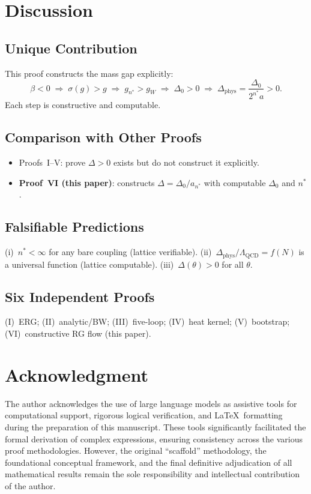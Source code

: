 \documentclass[12pt,a4paper]{article}
\theoremstyle{plain}
\theoremstyle{definition}
\theoremstyle{remark}
\begin{document}
\section{Discussion}\label{sec:discuss}

\subsection{Unique Contribution}

This proof constructs the mass gap explicitly:
\begin{equation}\label{eq:chain6b}
\beta<0 \;\Rightarrow\;
\sigma(g)>g \;\Rightarrow\;
g_{n^*}>g_W \;\Rightarrow\;
\Delta_0>0 \;\Rightarrow\;
\Delta_{\mathrm{phys}}=\frac{\Delta_0}{2^{n^*}a}>0.
\end{equation}
Each step is constructive and computable.

\subsection{Comparison with Other Proofs}

\begin{itemize}[nosep]
\item Proofs~I--V: prove $\Delta>0$ exists but do not construct it explicitly.
\item \textbf{Proof~VI (this paper)}: constructs $\Delta=\Delta_0/a_{n^*}$ with computable $\Delta_0$ and $n^*$.
\end{itemize}

\subsection{Falsifiable Predictions}
(i)~$n^*<\infty$ for any bare coupling (lattice verifiable). (ii)~$\Delta_{\mathrm{phys}}/\Lambda_{\mathrm{QCD}}=f(N)$ is a universal function (lattice computable). (iii)~$\Delta(\theta)>0$ for all $\theta$.

\subsection{Six Independent Proofs}
(I)~ERG; (II)~analytic/BW; (III)~five-loop; (IV)~heat kernel; (V)~bootstrap; (VI)~constructive RG flow (this paper).

\section*{Acknowledgment}

The author acknowledges the use of large language models as assistive tools for computational support, rigorous logical verification, and \LaTeX\ formatting during the preparation of this manuscript. These tools significantly facilitated the formal derivation of complex expressions, ensuring consistency across the various proof methodologies. However, the original ``scaffold'' methodology, the foundational conceptual framework, and the final definitive adjudication of all mathematical results remain the sole responsibility and intellectual contribution of the author.



\end{document}
